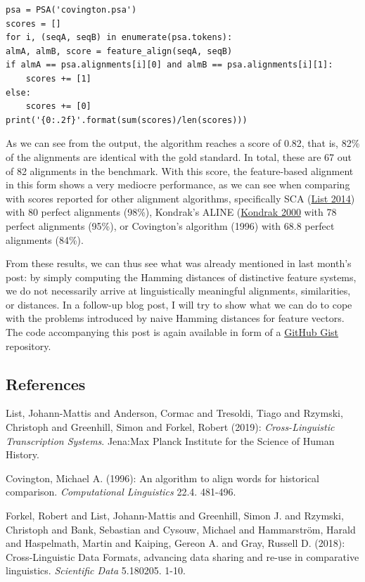 \documentclass[
  a4paper,
  14pt,
  oneside,
  tablecaptionabove
]{scrbook}
\begin{document}
\begin{lstlisting}
psa = PSA('covington.psa')
scores = []
for i, (seqA, seqB) in enumerate(psa.tokens):
almA, almB, score = feature_align(seqA, seqB)
if almA == psa.alignments[i][0] and almB == psa.alignments[i][1]:
    scores += [1]
else:
    scores += [0]
print('{0:.2f}'.format(sum(scores)/len(scores)))
\end{lstlisting}

As we can see from the output, the algorithm reaches a score of 0.82,
that is, 82\% of the alignments are identical with the gold standard. In
total, these are 67 out of 82 alignments in the benchmark. With this
score, the feature-based alignment in this form shows a very mediocre
performance, as we can see when comparing with scores reported for other
alignment algorithms, specifically SCA (\href{http://bibliography.lingpy.org?key=List2014d}{List 2014}) with 80
perfect alignments (98\%), Kondrak's ALINE (\href{http://bibliography.lingpy.org?key=Kondrak2000}{Kondrak 2000} with
78 perfect alignments (95\%), or Covington's algorithm (1996) with 68.8
perfect alignments (84\%).

From these results, we can thus see what was already mentioned in last
month's post: by simply computing the Hamming distances of distinctive
feature systems, we do not necessarily arrive at linguistically
meaningful alignments, similarities, or distances. In a follow-up blog
post, I will try to show what we can do to cope with the problems
introduced by naive Hamming distances for feature vectors. The code
accompanying this post is again available in form of a
\href{https://gist.github.com/LinguList/ce6da48112018365bccb94bcbec891b1}{GitHub
Gist} repository.

\subsection*{References}

\nopagebreak\hangindent=0.7cm {\small  List, Johann-Mattis and Anderson, Cormac and Tresoldi, Tiago and
Rzymski, Christoph and Greenhill, Simon and Forkel, Robert (2019):
\emph{Cross-Linguistic Transcription Systems}. Jena:Max Planck Institute for
the Science of Human History. }

\nopagebreak\hangindent=0.7cm {\small  Covington, Michael A. (1996): An algorithm to align words for
historical comparison. \emph{Computational Linguistics} 22.4.
481-496.}

\nopagebreak\hangindent=0.7cm {\small  Forkel, Robert and List, Johann-Mattis and Greenhill, Simon J. and
Rzymski, Christoph and Bank, Sebastian and Cysouw, Michael and
Hammarström, Harald and Haspelmath, Martin and Kaiping, Gereon A. and
Gray, Russell D. (2018): Cross-Linguistic Data Formats, advancing data
sharing and re-use in comparative linguistics. \emph{Scientific Data}
5.180205. 1-10. }
\end{document}
